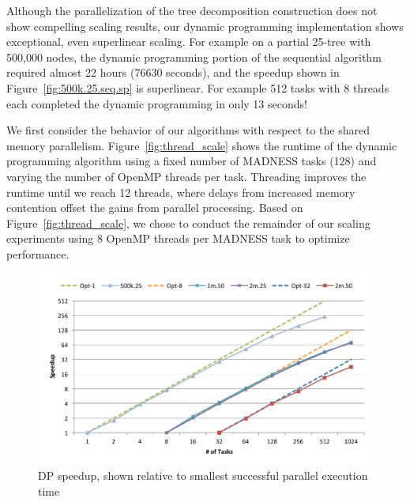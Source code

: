 \documentclass[conference]{IEEEtran}
\begin{document}
Although the parallelization of the tree decomposition
construction does not show compelling scaling results, our dynamic
programming implementation shows exceptional, even superlinear scaling.
For example on a partial 25-tree with 500,000 nodes, the dynamic programming portion of the
sequential algorithm required almost 22 hours (76630 seconds), and the
speedup shown in Figure~\ref{fig:500k.25.seq.sp} is superlinear. For example 512 tasks with
8 threads each completed the dynamic programming in only 13 seconds!

We first consider the behavior of our algorithms with respect to the shared memory parallelism.
Figure~\ref{fig:thread_scale} shows the runtime of the dynamic programming algorithm using
a fixed number of MADNESS tasks (128) and varying the number of OpenMP threads per task.
Threading improves the runtime until we reach 12 threads, where delays from increased memory contention
offset the gains from parallel processing.  Based on Figure~\ref{fig:thread_scale}, we chose to conduct
the remainder of our scaling experiments using 8 OpenMP threads per MADNESS task to optimize performance.

\begin{figure}[!ht]
\includegraphics[angle=0,width=6in]{figures/fig10_col.pdf}
\caption{DP speedup, shown relative to smallest successful parallel execution time}
\label{fig:DPspeedup}
\end{figure}
\end{document}

